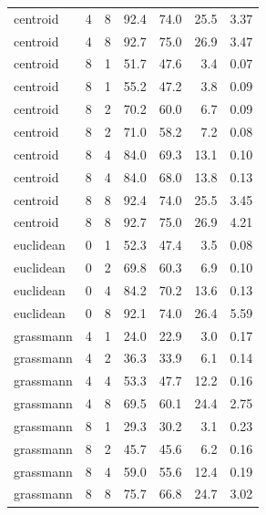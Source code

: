 \begin{tabular}{llrrrrr}
centroid & 4 & 8 & 92.4 & 74.0 & 25.5 & 3.37 \\
centroid & 4 & 8 & 92.7 & 75.0 & 26.9 & 3.47 \\
centroid & 8 & 1 & 51.7 & 47.6 & 3.4 & 0.07 \\
centroid & 8 & 1 & 55.2 & 47.2 & 3.8 & 0.09 \\
centroid & 8 & 2 & 70.2 & 60.0 & 6.7 & 0.09 \\
centroid & 8 & 2 & 71.0 & 58.2 & 7.2 & 0.08 \\
centroid & 8 & 4 & 84.0 & 69.3 & 13.1 & 0.10 \\
centroid & 8 & 4 & 84.0 & 68.0 & 13.8 & 0.13 \\
centroid & 8 & 8 & 92.4 & 74.0 & 25.5 & 3.45 \\
centroid & 8 & 8 & 92.7 & 75.0 & 26.9 & 4.21 \\
euclidean & 0 & 1 & 52.3 & 47.4 & 3.5 & 0.08 \\
euclidean & 0 & 2 & 69.8 & 60.3 & 6.9 & 0.10 \\
euclidean & 0 & 4 & 84.2 & 70.2 & 13.6 & 0.13 \\
euclidean & 0 & 8 & 92.1 & 74.0 & 26.4 & 5.59 \\
grassmann & 4 & 1 & 24.0 & 22.9 & 3.0 & 0.17 \\
grassmann & 4 & 2 & 36.3 & 33.9 & 6.1 & 0.14 \\
grassmann & 4 & 4 & 53.3 & 47.7 & 12.2 & 0.16 \\
grassmann & 4 & 8 & 69.5 & 60.1 & 24.4 & 2.75 \\
grassmann & 8 & 1 & 29.3 & 30.2 & 3.1 & 0.23 \\
grassmann & 8 & 2 & 45.7 & 45.6 & 6.2 & 0.16 \\
grassmann & 8 & 4 & 59.0 & 55.6 & 12.4 & 0.19 \\
grassmann & 8 & 8 & 75.7 & 66.8 & 24.7 & 3.02 \\
\bottomrule
\end{tabular}
